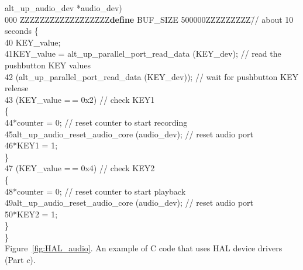 \documentclass[11pt, twoside, pdftex]{article}
\begin{document}
\begin{table}
\begin{center}
\begin{minipage}[t]{12.5 cm}
\begin{tabbing}
\>\>alt\_up\_audio\_dev *audio\_dev)\\
000 \=ZZZ\=ZZZ\=ZZZ\=ZZZ\=ZZZ\=ZZZ\={\bf define} BUF\_SIZE 500000ZZZZZZZZZ\=// about 10 seconds \kill
\>\{\\
40\> KEY\_value;\\
41\>\>KEY\_value = alt\_up\_parallel\_port\_read\_data (KEY\_dev); \>\>\>\>\>\>// read the pushbutton KEY values\\
42\> (alt\_up\_parallel\_port\_read\_data (KEY\_dev)); \>\>\>\>\>\>// wait for pushbutton KEY release\\
43\> (KEY\_value =$\,$= 0x2)	\>\>\>\>\>\>// check KEY1\\
\>\>\{\\
44\>\>\>*counter = 0; \>\>\>\>\>// reset counter to start recording\\
45\>\>\>alt\_up\_audio\_reset\_audio\_core (audio\_dev); \>\>\>\>\>// reset audio port\\
46\>\>\>*KEY1 = 1;\\
\>\>\}\\
47\> (KEY\_value =$\,$= 0x4) \>\>\>\>\>\>// check KEY2\\
\>\>\{\\
48\>\>\>*counter = 0; \>\>\>\>\>// reset counter to start playback\\
49\>\>\>alt\_up\_audio\_reset\_audio\_core (audio\_dev); \>\>\>\>\>// reset audio port\\
50\>\>\>*KEY2 = 1;\\
\>\>\}\\
\>\}\\
 
\>\>\>\>Figure~\ref{fig:HAL_audio}. An example of C code that uses HAL device drivers (Part $c$).
\end{tabbing}
\end{minipage}
\end{center}
\end{table}

\clearpage
\end{document}
